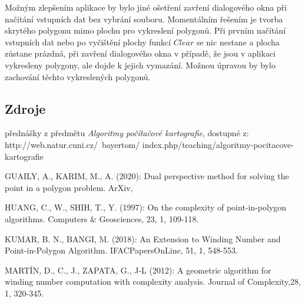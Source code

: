 \documentclass[15pt]{article}
\begin{document}
\begin{spacing}{1.5}
Možným zlepšením aplikace by bylo jiné ošetření zavření dialogového okna při načítání vstupních dat bez vybrání souboru. Momentálním řešením je tvorba skrytého polygonu mimo plochu pro vykreslení polygonů. Při prvním načítání vstupních dat nebo po vyčištění plochy funkcí $Clear$ se nic nestane a plocha zůstane prázdná, při zavření dialogového okna v případě, že jsou v aplikaci vykresleny polygony, ale dojde k jejich vymazání. Možnou úpravou by bylo zachování těchto vykreslených polygonů.

\newpage
\subsection*{Zdroje}

\noindent přednášky z předmětu \textit{Algoritmy počítačové kartografie}, dostupné z: http://web.natur.cuni.cz/~bayertom/
\noindent index.php/teaching/algoritmy-pocitacove-kartografie 

\noindent GUAILY, A., KARIM, M., A. (2020): Dual perspective method for solving the point in a polygon problem. ArXiv, 

\noindent HUANG, C., W., SHIH, T., Y. (1997): On the complexity of point-in-polygon algorithms. Computers \& Geosciences, 23, 1, 109-118. 

\noindent KUMAR, B. N., BANGI, M. (2018): An Extension to Winding Number and Point-in-Polygon Algorithm. IFACPapersOnLine, 51, 1, 548-553. 

\noindent MARTÍN, D., C., J., ZAPATA, G., J-L (2012): A geometric algorithm for winding number computation with complexity analysis. Journal of Complexity,28, 1, 320-345.

\end{spacing}
\end{document}
